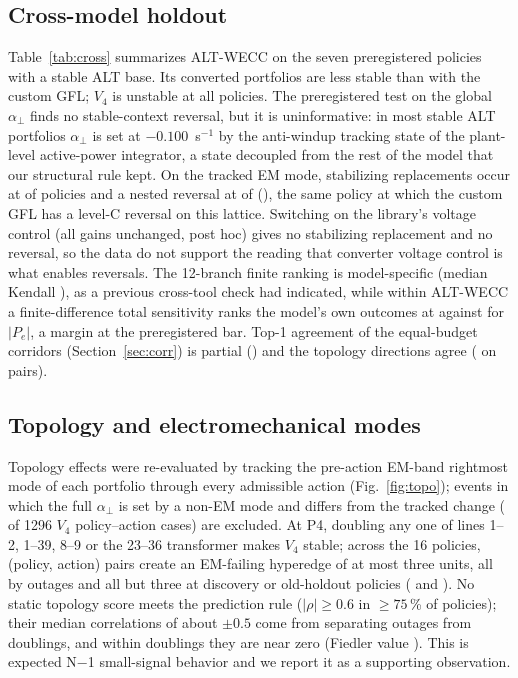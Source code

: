\documentclass[journal]{IEEEtran}
\theoremstyle{remark}
\newcommand{\aperp}{\alpha_{\perp}}
\begin{document}
\subsection{Cross-model holdout}\label{sec:cross}
Table~\ref{tab:cross} summarizes ALT-WECC on the seven preregistered policies
with a stable ALT base. Its converted portfolios are less stable than with the
custom GFL; $V_4$ is unstable at all policies. The preregistered test on the
global $\aperp$ finds no stable-context reversal, but it is uninformative: in
most stable ALT portfolios $\aperp$ is set at $-0.100$~s$^{-1}$ by the anti-windup
tracking state of the plant-level active-power integrator, a state decoupled
from the rest of the model that our structural rule kept. On the tracked EM mode,
stabilizing replacements occur at \altEmStab{} of \altEmN{} policies and a nested reversal at \altEmRev{} of
\altEmN{} (\altEmPol), the same policy at which the custom GFL has a level-C reversal on this
lattice.
Switching on the library's voltage control (all gains unchanged, post hoc) gives
no stabilizing replacement and no reversal, so the data do not support the
reading that converter voltage control is what enables reversals. The 12-branch
finite ranking is model-specific (median Kendall \altCMedianKendall), as a previous
cross-tool check had indicated, while within ALT-WECC a finite-difference total
sensitivity ranks the model's own outcomes at \altCMedianRhoAltfd{} against
\altCMedianRhoS{} for $|P_e|$, a margin at the preregistered bar. Top-1 agreement
of the equal-budget corridors (Section~\ref{sec:corr}) is partial (\altDFracTopAgree) and the
topology directions agree (\altEPooledSignAgree{} on \altENPairs{} pairs).



\subsection{Topology and electromechanical modes}
Topology effects were re-evaluated by tracking the pre-action EM-band rightmost
mode of each portfolio through every admissible action (Fig.~\ref{fig:topo});
events in which the full $\aperp$ is set by a non-EM mode and differs from the
tracked change (\topoFastHfour{} of 1296 $V_4$ policy--action cases) are excluded. At
P4, doubling any one of lines 1--2, 1--39, 8--9 or the 23--36 transformer makes
$V_4$ stable; across the 16 policies, \topoNcreate{} (policy, action) pairs create an
EM-failing hyperedge of at most three units, all by outages and all but three at
discovery or old-holdout policies (\creDisc{} and \creOld). No static topology score
meets the prediction rule ($|\rho|\ge0.6$ in $\ge75$\,\% of policies); their median
correlations of about $\pm0.5$ come from separating outages from doublings, and
within doublings they are near zero (Fiedler value \withinDblFiedler). This is
expected N$-$1 small-signal behavior and we report it as a supporting observation.
\end{document}
